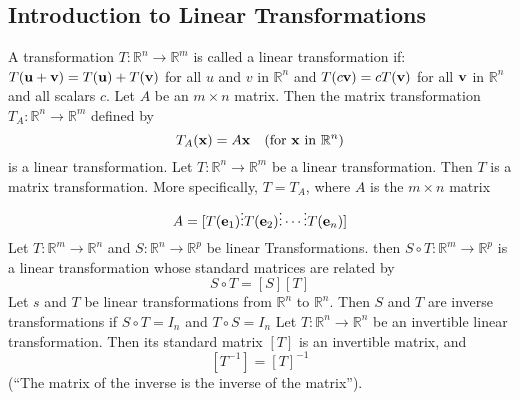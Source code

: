 \documentclass{article}
\begin{document}
   \subsection{Introduction to Linear Transformations}
   \begin{outline}
        \1 A transformation \(T:\mathbb R^n\to \mathbb R^m\) is called a linear transformation if:
            \2 \(T(\vb u+\vb v)=T(\vb u)+T(\vb v)\) for all \(u\) and \(v\) in \(\mathbb R^n\) and 
            \2 \(T(c\vb v)=cT(\vb v)\) for all \(\vb v\) in \(\mathbb R^n\) and all scalars $c$. 
        \1 Let \(A\) be an \(m\times n\) matrix. Then the matrix transformation \(T_A:\mathbb R^n\to\mathbb R^m\) defined by \[T_A(\vb x)=A\vb x\quad (\text{for }\vb x\text{ in }\mathbb R^n)\] is a linear transformation. 
        \1 Let \(T:\mathbb R^n\to \mathbb R^m\) be a linear transformation. Then \(T\) is a matrix transformation. More specifically, \(T=T_A\), where \(A\) is the \(m\times n\) matrix \[A=[T(\vb e_1)\vdots T(\vb e_2)\vdots\cdots\vdots T(\vb e_n)]\]
        \1 Let \(T:\mathbb R^m\to \mathbb R^n\) and \(S:\mathbb R^n\to\mathbb R^p\) be linear Transformations. then \(S\circ T:\mathbb R^m\to\mathbb R^p\) is a linear transformation whose standard matrices are related by \[S\circ T=[S][T]\]
        \1 Let $s$ and $T$ be linear transformations from \(\mathbb R^n\) to \(\mathbb R^n\). Then $S$ and $T$ are inverse transformations if \(S\circ T=I_n\) and \(T\circ S=I_n\)
        \1 Let \(T:\mathbb R^n\to\mathbb R^n\) be an invertible linear transformation. Then its standard matrix \([T]\) is an invertible matrix, and \[[T^{-1}]=[T]^{-1}\] (``The matrix of the inverse is the inverse of the matrix''). 

   \end{outline}
\end{document}

